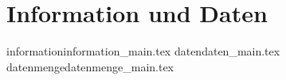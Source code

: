 \part{Information und Daten}
\label{part-information-und-daten}

	{information}{information_main.tex}
	{daten}{daten_main.tex}
	{datenmenge}{datenmenge_main.tex}